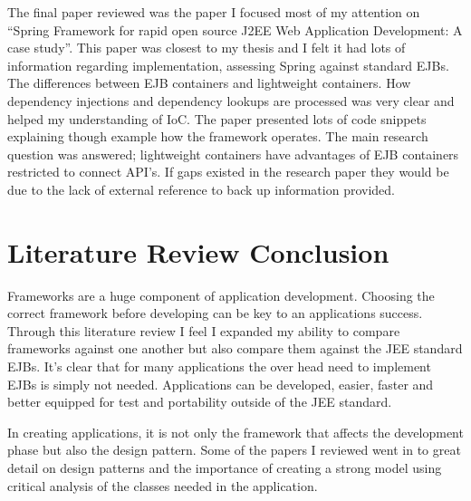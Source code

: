 														The final paper reviewed was the paper I focused most of my attention on “Spring Framework for rapid open source J2EE Web Application Development: A case study”. This paper was closest to my thesis and I felt it had lots of information regarding implementation, assessing Spring against standard EJBs. The differences between EJB containers and lightweight containers. How dependency injections and dependency lookups are processed was very clear and helped my understanding of IoC. The paper presented lots of code snippets explaining though example how the framework operates. The main research question was answered; lightweight containers have advantages of EJB containers restricted to connect API’s. If gaps existed in the research paper they would be due to the lack of external reference to back up information provided.
														
														\section{Literature Review Conclusion}
														Frameworks are a huge component of application development. Choosing the correct framework before developing can be key to an applications success. Through this literature review I feel I expanded my ability to compare frameworks against one another but also compare them against the JEE standard EJBs. It’s clear that for many applications the over head need to implement EJBs is simply not needed. Applications can be developed, easier, faster and better equipped for test and portability outside of the JEE standard. 
														
														In creating applications, it is not only the framework that affects the development phase but also the design pattern. Some of the papers I reviewed went in to great detail on design patterns and the importance of creating a strong model using critical analysis of the classes needed in the application.
														
														\newpage
														
